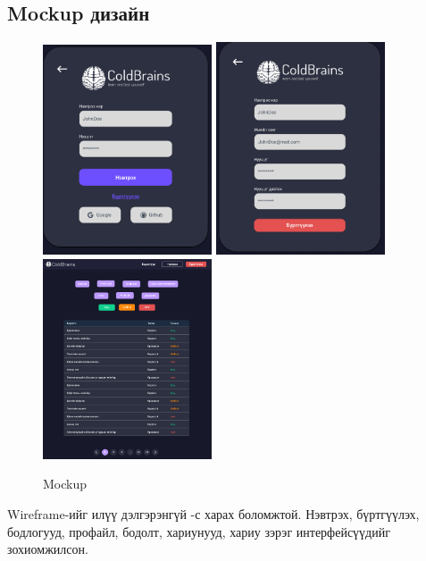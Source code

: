 \subsection{Mockup дизайн}
\begin{figure}[h]
  \centering
  \includegraphics[width=5cm]{img/mockup/login.PNG}
  \includegraphics[width=5cm]{img/mockup/register.PNG}
  \includegraphics[width=5cm]{img/mockup/problems.PNG}
  \caption{Mockup}
\end{figure}

\clearpage

Wireframe-ийг илүү дэлгэрэнгүй \cite{wireframe}-с харах боломжтой. Нэвтрэх, бүртгүүлэх, бодлогууд, профайл, бодолт, хариунууд, хариу зэрэг интерфейсүүдийг зохиомжилсон.

